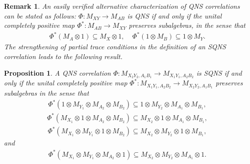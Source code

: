 \documentclass[11pt]{amsart}
\newtheorem{proposition}[theorem]{Proposition}
\newtheorem{remark}[theorem]{Remark}
\begin{document}
\begin{remark}
\rm An easily verified alternative characterization of QNS correlations can be stated as follows: $\Phi: M_{XY}\rightarrow M_{AB}$ is QNS if and only if the unital completely positive map $\Phi^{*}: M_{AB}\rightarrow M_{XY}$ preserves subalgebras, in the sense that
\begin{gather*}
	\Phi^{*}(M_{A}\otimes 1) \subseteq M_{X}\otimes 1, \;\;\;\; \Phi^{*}(1\otimes M_{B}) \subseteq 1\otimes M_{Y}.
\end{gather*}
The strengthening of partial trace conditions in the definition of an SQNS correlation leads to the following result.
\end{remark}
\begin{proposition}
A QNS correlation $\Phi: M_{X_{2}Y_{2}, A_{1}B_{1}}\rightarrow M_{X_{1}Y_{1}, A_{2}B_{2}}$ is SQNS if and only if the unital completely positive map $\Phi^{*}: M_{X_{1}Y_{1}, A_{2}B_{2}}\rightarrow M_{X_{2}Y_{2}, A_{1}B_{1}}$ preserves subalgebras in the sense that
\begin{gather}\label{sub_alg_one}
	\Phi^{*}(1\otimes M_{Y_{1}}\otimes M_{A_{2}}\otimes M_{B_{2}}) \subseteq 1\otimes M_{Y_{2}}\otimes M_{A_{1}}\otimes M_{B_{1}},
\end{gather}
\begin{gather}\label{sub_alg_two}
	 \Phi^{*}(M_{X_{1}}\otimes 1\otimes M_{A_{2}} \otimes M_{B_{2}}) \subseteq M_{X_{2}}\otimes 1\otimes M_{A_{1}}\otimes M_{B_{1}},
\end{gather}
\begin{gather}\label{sub_alg_three}
	\Phi^{*}(M_{X_{1}}\otimes M_{Y_{1}}\otimes 1\otimes M_{B_{2}}) \subseteq M_{X_{2}}\otimes M_{Y_{2}}\otimes 1\otimes M_{B_{1}},
\end{gather}
\noindent and
\begin{gather}\label{sub_alg_four}
	\Phi^{*}(M_{X_{1}}\otimes M_{Y_{1}}\otimes M_{A_{2}}\otimes 1) \subseteq M_{X_{2}}\otimes M_{Y_{2}}\otimes M_{A_{1}}\otimes 1.
\end{gather}
\end{proposition}
\end{document}
